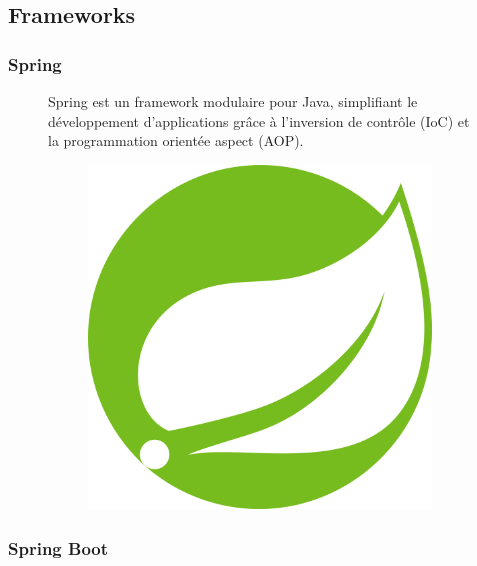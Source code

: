 \documentclass[12pt,a4paper]{report}
\begin{document}
	\subsection{Frameworks}
	
	\subsubsection{Spring}
	
	\begin{figure}[H]
		\begin{minipage}{0.8\textwidth}
			Spring est un framework modulaire pour Java, simplifiant le développement d'applications grâce à l’inversion de contrôle (IoC) et la programmation orientée aspect (AOP).
		\end{minipage}
		\hfill
		\begin{minipage}{0.15\textwidth} 
			\begin{figure}[H]
				\centering
				\includegraphics[width=\linewidth]{spring-logo.png}
				\label{fig:spring-logo}
			\end{figure}
		\end{minipage}
	\end{figure}
	
	\subsubsection{Spring Boot}
	
\end{document}
